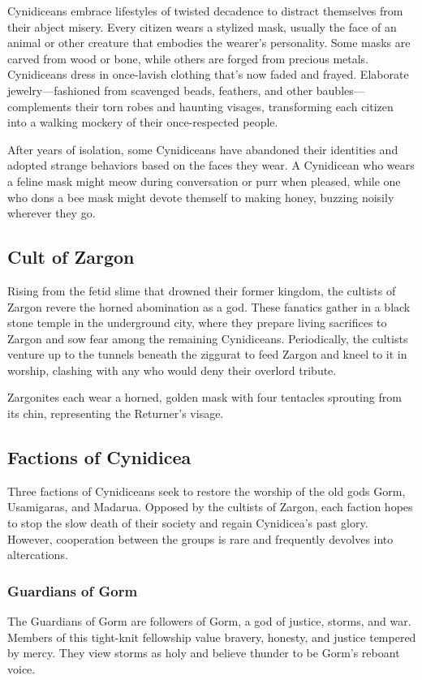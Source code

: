 \documentclass[10pt,a4paper,twoside,bg=print,twocolumn,openany,nodeprecatedcode]{dndbook}
\begin{document}
Cynidiceans embrace lifestyles of twisted decadence to distract themselves from their abject misery. Every citizen wears a stylized mask, usually the face of an animal or other creature that embodies the wearer's personality. Some masks are carved from wood or bone, while others are forged from precious metals. Cynidiceans dress in once-lavish clothing that's now faded and frayed. Elaborate jewelry—fashioned from scavenged beads, feathers, and other baubles—complements their torn robes and haunting visages, transforming each citizen into a walking mockery of their once-respected people.

After years of isolation, some Cynidiceans have abandoned their identities and adopted strange behaviors based on the faces they wear. A Cynidicean who wears a feline mask might meow during conversation or purr when pleased, while one who dons a bee mask might devote themself to making honey, buzzing noisily wherever they go.

\subsection{Cult of Zargon}
Rising from the fetid slime that drowned their former kingdom, the cultists of Zargon revere the horned abomination as a god. These fanatics gather in a black stone temple in the underground city, where they prepare living sacrifices to Zargon and sow fear among the remaining Cynidiceans. Periodically, the cultists venture up to the tunnels beneath the ziggurat to feed Zargon and kneel to it in worship, clashing with any who would deny their overlord tribute.

Zargonites each wear a horned, golden mask with four tentacles sprouting from its chin, representing the Returner's visage.

\subsection{Factions of Cynidicea}
Three factions of Cynidiceans seek to restore the worship of the old gods Gorm, Usamigaras, and Madarua. Opposed by the cultists of Zargon, each faction hopes to stop the slow death of their society and regain Cynidicea's past glory. However, cooperation between the groups is rare and frequently devolves into altercations.

\subsubsection{Guardians of Gorm}
The Guardians of Gorm are followers of Gorm, a god of justice, storms, and war. Members of this tight-knit fellowship value bravery, honesty, and justice tempered by mercy. They view storms as holy and believe thunder to be Gorm's reboant voice.
\end{document}
